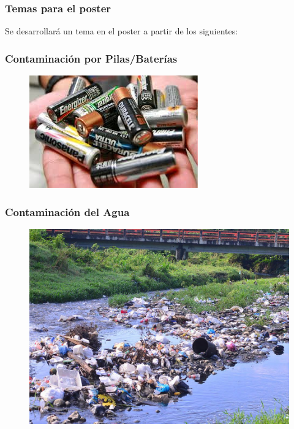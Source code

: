 \documentclass[14pt]{beamer}
\begin{document}
\begin{frame}
\frametitle{Temas para el poster}
Se desarrollará un tema en el poster a partir de los siguientes:
\end{frame}
\begin{frame}
\frametitle{Contaminación por Pilas/Baterías}
\vspace*{-1cm}
\begin{figure}
    \centering
    \includegraphics[scale=0.75]{Imagenes/Contaminacion_01.jpg}
\end{figure}
\end{frame}
\begin{frame}
\frametitle{Contaminación del Agua}
\vspace*{-1cm}
\begin{figure}
    \centering
    \includegraphics[scale=0.35]{Imagenes/Contaminacion_02.jpg}
\end{figure}
\end{frame}
\end{document}
